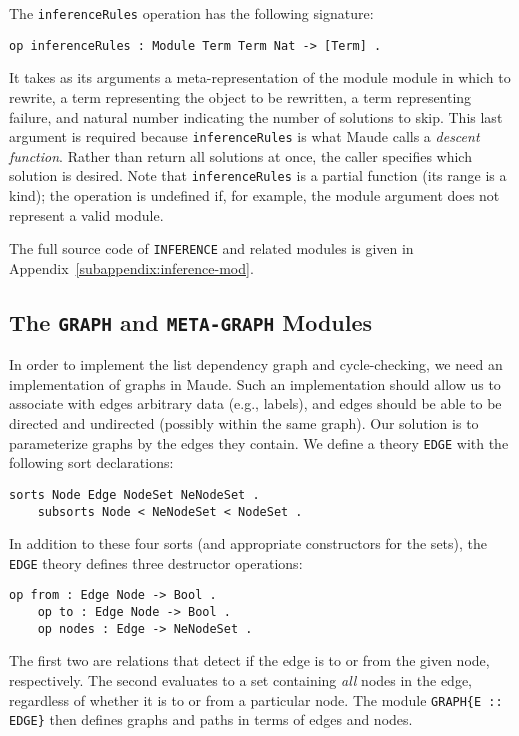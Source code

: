 \documentclass[11pt]{article}
\begin{document}
The \lstinline|inferenceRules| operation has the following signature:
\begin{lstlisting}[language=Maude, style=smalllisting]
    op inferenceRules : Module Term Term Nat -> [Term] .
\end{lstlisting}
It takes as its arguments a meta-representation of the module module in which
to rewrite, a term representing the object to be rewritten, a term representing
failure, and natural number indicating the number of solutions to skip. This
last argument is required because \lstinline|inferenceRules| is what Maude
calls a \emph{descent function}. Rather than return all solutions at once, the caller
specifies which solution is desired. Note that \lstinline|inferenceRules| is a
partial function (its range is a kind); the operation is undefined if, for
example, the module argument does not represent a valid module.

The full source code of \lstinline|INFERENCE| and related modules is given in
Appendix~\ref{subappendix:inference-mod}.

\subsection{The \lstinline|GRAPH| and \lstinline|META-GRAPH| Modules}
\label{subsection:graph-mod}

In order to implement the list dependency graph and cycle-checking, we need an
implementation of graphs in Maude. Such an implementation should allow us to
associate with edges arbitrary data (e.g., labels), and edges should be able to
be directed and undirected (possibly within the same graph). Our solution is to
parameterize graphs by the edges they contain. We define a theory
\lstinline|EDGE| with the following sort declarations:
\begin{lstlisting}[language=Maude, style=smalllisting]
    sorts Node Edge NodeSet NeNodeSet .
    subsorts Node < NeNodeSet < NodeSet .
\end{lstlisting}
In addition to these four sorts (and appropriate constructors for the sets),
the \lstinline|EDGE| theory defines three destructor operations:
\begin{lstlisting}[language=Maude, style=smalllisting]
    op from : Edge Node -> Bool .
    op to : Edge Node -> Bool .
    op nodes : Edge -> NeNodeSet .
\end{lstlisting}

The first two are relations that detect if the edge is to or from the given
node, respectively. The second evaluates to a set containing \emph{all} nodes
in the edge, regardless of whether it is to or from a particular node.  The
module \lstinline|GRAPH{E :: EDGE}| then defines graphs and paths in terms of
edges and nodes.
\end{document}
